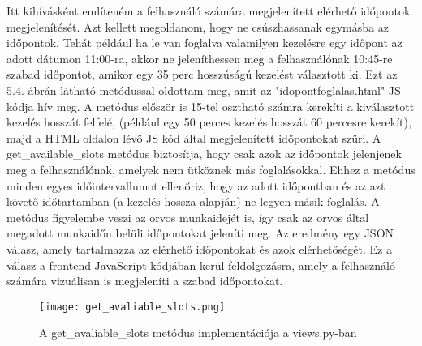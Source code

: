 \begin{enumerate}
	 Itt kihívásként említeném a felhasználó számára megjelenített elérhető időpontok megjelenítését. Azt kellett megoldanom, hogy ne csúszhassanak egymásba az időpontok. Tehát például ha le van foglalva valamilyen kezelésre egy időpont az adott dátumon 11:00-ra, akkor ne jeleníthessen meg a felhasználónak 10:45-re szabad időpontot, amikor egy 35 perc hosszúságú kezelést választott ki. Ezt az 5.4. ábrán látható metódussal oldottam meg, amit az "idopontfoglalas.html" JS kódja hív meg. A metódus először is 15-tel osztható számra kerekíti a kiválasztott kezelés hosszát felfelé, (például egy 50 perces kezelés hosszát 60 percesre kerekít), majd a HTML oldalon lévő JS kód által megjelenített időpontokat szűri. A get\_available\_slots metódus biztosítja, hogy csak azok az időpontok jelenjenek meg a felhasználónak, amelyek nem ütköznek más foglalásokkal. Ehhez a metódus minden egyes időintervallumot ellenőriz, hogy az adott időpontban és az azt követő időtartamban (a kezelés hossza alapján) ne legyen másik foglalás. A metódus figyelembe veszi az orvos munkaidejét is, így csak az orvos által megadott munkaidőn belüli időpontokat jeleníti meg. Az eredmény egy JSON válasz, amely tartalmazza az elérhető időpontokat és azok elérhetőségét. Ez a válasz a frontend JavaScript kódjában kerül feldolgozásra, amely a felhasználó számára vizuálisan is megjeleníti a szabad időpontokat.
	 
	  \begin{figure}[H]
	 	\caption{A get\_avaliable\_slots metódus implementációja a views.py-ban}
	 	\label{fig:getavaliableslots}
	 	\centering
	 	\texttt{[image: get\_avaliable\_slots.png]}
	 \end{figure}
	 

\end{enumerate}
